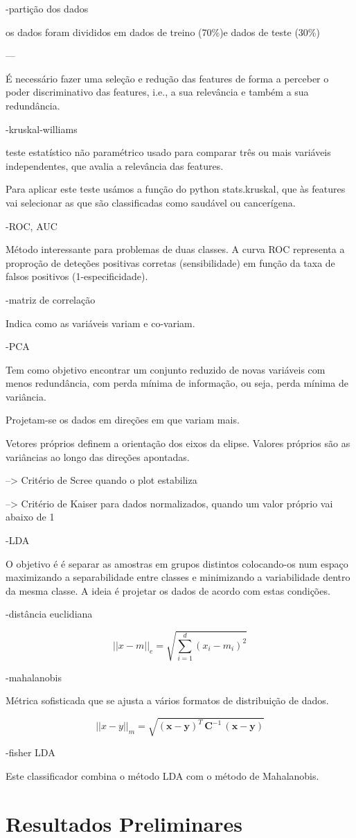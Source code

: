 \documentclass[a4paper,12pt]{article}
\begin{document}
-partição dos dados

os dados foram divididos em dados de treino (70\%)e dados de teste (30\%)

---

É necessário fazer uma seleção e redução das features de forma a perceber o poder discriminativo das features, i.e., a sua relevância e também a sua redundância.

-kruskal-williams

teste estatístico não paramétrico usado para comparar três ou mais variáveis independentes, que avalia a relevância das features.

Para aplicar este teste usámos a função do python stats.kruskal, que às features vai selecionar as que são classificadas como saudável ou cancerígena.

-ROC, AUC

Método interessante para problemas de duas classes. A curva ROC representa a proproção de deteções positivas corretas (sensibilidade) em função da taxa de falsos positivos (1-especificidade).

-matriz de correlação

Indica como as variáveis variam e co-variam.

-PCA

Tem como objetivo encontrar um conjunto reduzido de novas variáveis com menos redundância, com perda mínima de informação, ou seja, perda mínima de variância.

Projetam-se os dados em direções em que variam mais.

Vetores próprios definem a orientação dos eixos da elipse.
Valores próprios são as variâncias ao longo das direções apontadas.

--> Critério de Scree
quando o plot estabiliza

--> Critério de Kaiser
para dados normalizados, quando um valor próprio vai abaixo de 1


-LDA

O objetivo é é separar as amostras em grupos distintos colocando-os num espaço maximizando a separabilidade entre classes e minimizando a variabilidade dentro da mesma classe. A ideia é projetar os dados de acordo com estas condições.

-distância euclidiana

\[
||x-m||_e = \sqrt{\sum_{i=1}^{d} (x_i - m_i)^2}
\]

-mahalanobis

Métrica sofisticada que se ajusta a vários formatos de distribuição de dados.

\[
||x-y||_m = \sqrt{(\mathbf{x} - \mathbf{y})^{T} \, \mathbf{C}^{-1} \, (\mathbf{x} - \mathbf{y})}
\]

-fisher LDA

Este classificador combina o método LDA com o método de Mahalanobis.

\section*{Resultados Preliminares}
\end{document}
